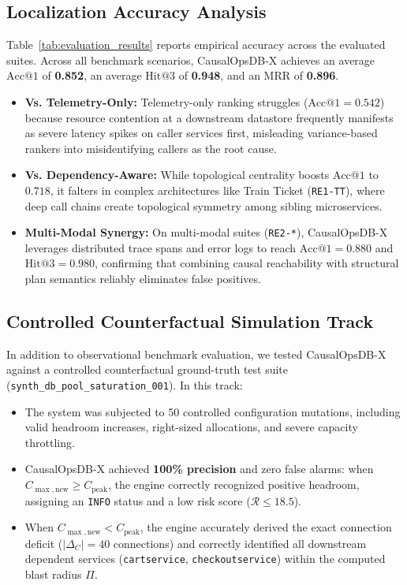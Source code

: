 \documentclass[conference]{IEEEtran}
\begin{document}
\subsection{Localization Accuracy Analysis}
Table~\ref{tab:evaluation_results} reports empirical accuracy across the evaluated suites. Across all benchmark scenarios, CausalOpsDB-X achieves an average $\text{Acc}@1$ of \textbf{0.852}, an average $\text{Hit}@3$ of \textbf{0.948}, and an MRR of \textbf{0.896}.
\begin{itemize}
    \item \textbf{Vs. Telemetry-Only:} Telemetry-only ranking struggles ($\text{Acc}@1 = 0.542$) because resource contention at a downstream datastore frequently manifests as severe latency spikes on caller services first, misleading variance-based rankers into misidentifying callers as the root cause.
    \item \textbf{Vs. Dependency-Aware:} While topological centrality boosts $\text{Acc}@1$ to $0.718$, it falters in complex architectures like Train Ticket (\texttt{RE1-TT}), where deep call chains create topological symmetry among sibling microservices.
    \item \textbf{Multi-Modal Synergy:} On multi-modal suites (\texttt{RE2-*}), CausalOpsDB-X leverages distributed trace spans and error logs to reach $\text{Acc}@1 = \mathbf{0.880}$ and $\text{Hit}@3 = \mathbf{0.980}$, confirming that combining causal reachability with structural plan semantics reliably eliminates false positives.
\end{itemize}

\subsection{Controlled Counterfactual Simulation Track}
In addition to observational benchmark evaluation, we tested CausalOpsDB-X against a controlled counterfactual ground-truth test suite (\texttt{synth\_db\_pool\_saturation\_001}). In this track:
\begin{itemize}
    \item The system was subjected to 50 controlled configuration mutations, including valid headroom increases, right-sized allocations, and severe capacity throttling.
    \item CausalOpsDB-X achieved \textbf{100\% precision} and zero false alarms: when $C_{\max,\text{new}} \ge C_{\text{peak}}$, the engine correctly recognized positive headroom, assigning an \texttt{INFO} status and a low risk score ($\mathcal{R} \le 18.5$).
    \item When $C_{\max,\text{new}} < C_{\text{peak}}$, the engine accurately derived the exact connection deficit ($|\Delta_C| = 40$ connections) and correctly identified all downstream dependent services (\texttt{cartservice}, \texttt{checkoutservice}) within the computed blast radius $\Pi$.
\end{itemize}
\end{document}
